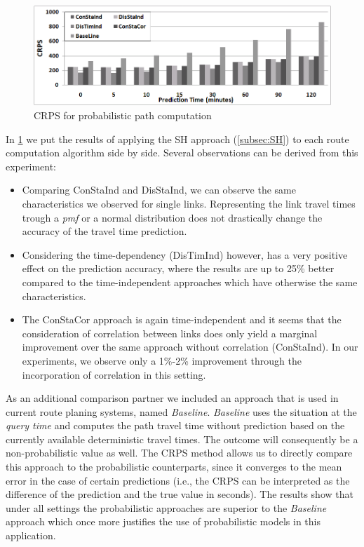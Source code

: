 \begin{figure}[h]
	\centering
	\includegraphics[width = 0.9\columnwidth]{figures/Approaches_All.png}
	\caption{CRPS for probabilistic path computation}\label{fig:path_comp}
\end{figure}

In \cref{fig:path_comp} we put the results of applying the SH approach (\cref{subsec:SH}) to each route computation algorithm side by side. Several observations can be derived from this experiment:

\begin{itemize}
\item Comparing ConStaInd and DisStaInd, we can observe the same characteristics we observed for single links. Representing the link travel times trough a \textit{pmf} or a normal distribution does not drastically change the accuracy of the travel time prediction.
\item  Considering the time-dependency (DisTimInd) however, has a very positive effect on the prediction accuracy, where the results are up to 25\% better compared to the time-independent approaches which have otherwise the same characteristics.
\item The ConStaCor approach is again time-independent and it seems that the consideration of correlation between links does only yield a marginal improvement over the same approach without correlation (ConStaInd). In our experiments, we observe only a 1\%-2\% improvement through the incorporation of correlation in this setting.
\end{itemize}

As an additional comparison partner we included an approach that is used in current route planing systems, named \textit{Baseline}. \textit{Baseline} uses the situation at the \textit{query time} and computes the path travel time without prediction based on the currently available deterministic travel times. The outcome will consequently be a non-probabilistic value as well. The CRPS method allows us to directly compare this approach to the probabilistic counterparts, since it converges to the mean error in the case of certain predictions (i.e., the CRPS can be interpreted as the difference of the prediction and the true value in seconds). The results show that under all settings the probabilistic approaches are superior to the \textit{Baseline} approach which once more justifies the use of probabilistic models in this application.

